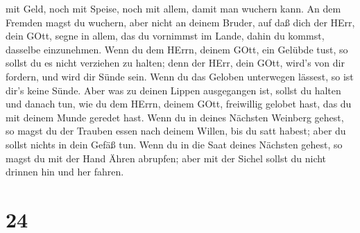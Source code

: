 mit Geld, noch mit Speise, noch mit allem, damit man wuchern kann.
 An dem Fremden magst du wuchern, aber nicht an deinem
Bruder, auf daß dich der HErr, dein GOtt, segne in allem, das du
vornimmst im Lande, dahin du kommst, dasselbe einzunehmen. 
Wenn du dem HErrn, deinem GOtt, ein Gelübde tust, so sollst du es nicht
verziehen zu halten; denn der HErr, dein GOtt, wird's von dir fordern,
und wird dir Sünde sein.  Wenn du das Geloben unterwegen
lässest, so ist dir's keine Sünde.  Aber was zu deinen
Lippen ausgegangen ist, sollst du halten und danach tun, wie du dem
HErrn, deinem GOtt, freiwillig gelobet hast, das du mit deinem Munde
geredet hast.  Wenn du in deines Nächsten Weinberg gehest,
so magst du der Trauben essen nach deinem Willen, bis du satt habest;
aber du sollst nichts in dein Gefäß tun.  Wenn du in die
Saat deines Nächsten gehest, so magst du mit der Hand Ähren abrupfen;
aber mit der Sichel sollst du nicht drinnen hin und her fahren.

\hypertarget{section-23}{%
\section{24}\label{section-23}}

